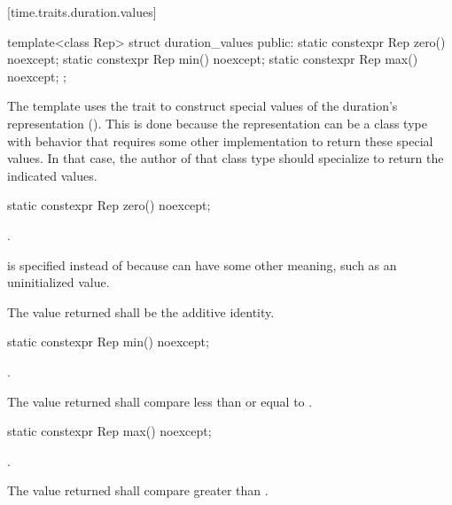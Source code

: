 [time.traits.duration.values]{}

%
\begin{itemdecl}
template<class Rep>
  struct duration_values {
  public:
    static constexpr Rep zero() noexcept;
    static constexpr Rep min() noexcept;
    static constexpr Rep max() noexcept;
  };
\end{itemdecl}

\pnum
The  template uses the  trait to
construct special values of the duration's representation (). This is
done because the representation can be a class type with behavior that
requires some other implementation to return these special values. In that case,
the author of that class type should specialize  to
return the indicated values.

%
\begin{itemdecl}
static constexpr Rep zero() noexcept;
\end{itemdecl}

\begin{itemdescr}
\pnum
\returns
{}.
\begin{note}
 is specified instead of
 because  can have some other meaning, such as an
uninitialized value.
\end{note}

\pnum
\remarks
The value returned shall be the additive identity.
\end{itemdescr}

%
\begin{itemdecl}
static constexpr Rep min() noexcept;
\end{itemdecl}

\begin{itemdescr}
\pnum
\returns
{}.

\pnum
\remarks
The value returned shall compare less than or equal to .
\end{itemdescr}

%
\begin{itemdecl}
static constexpr Rep max() noexcept;
\end{itemdecl}

\begin{itemdescr}
\pnum
\returns
{}.

\pnum
\remarks
The value returned shall compare greater than .
\end{itemdescr}

